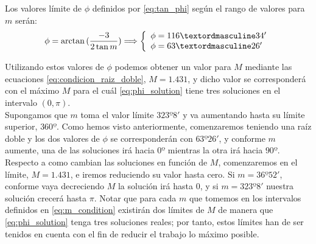 Los valores límite de $\phi$ definidos por \eqref{eq:tan_phi} según el rango de valores para $m$ serán:
\begin{align}
\phi=\arctan{(\ddfrac{-3}{2\tan{m}})} \Longrightarrow
\left\{
\begin{array}{l}
	\phi=116º34'\\
	\phi=63º26'
\end{array}
\right.
\end{align}

Utilizando estos valores de $\phi$ podemos obtener un valor para $M$ mediante las ecuaciones \eqref{eq:condicion_raiz_doble}, $M=1.431$, y dicho valor se corresponderá con el máximo $M$ para el cuál \eqref{eq:phi_solution} tiene tres soluciones en el intervalo $(0,\pi)$.\\

Supongamos que $m$ toma el valor límite $323º8'$ y va aumentando hasta su límite superior, $360º$. Como hemos visto anteriormente, comenzaremos teniendo una raíz doble y los dos valores de $\phi$ se corresponderán con $63º26'$, y conforme $m$ aumente, una de las soluciones irá hacia $0º$ mientras la otra irá hacia $90º$. Respecto a como cambian las soluciones en función de $M$, comenzaremos en el límite, $M=1.431$, e iremos reduciendo su valor hasta cero. Si $m=36º52'$, conforme vaya decreciendo $M$ la solución irá hasta $0$, y si $m=323º8'$ nuestra solución crecerá hasta $\pi$. Notar que para cada $m$ que tomemos en los intervalos definidos en \eqref{eq:m_condition} existirán dos límites de $M$ de manera que \eqref{eq:phi_solution} tenga tres soluciones reales; por tanto, estos límites han de ser tenidos en cuenta con el fin de reducir el trabajo lo máximo posible.\\




